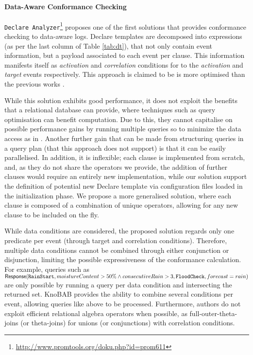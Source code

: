 \paragraph*{Data-Aware Conformance Checking}
\texttt{Declare Analyzer}\footnote{\url{http://www.promtools.org/doku.php?id=prom611}} \cite{BurattinMS16} proposes one of the first solutions that provides conformance checking to data-aware logs. Declare templates are decomposed into \LTLf expressions (as per the last column of Table \ref{tab:dt}), that not only contain event information, but a payload associated to each event per clause. This information manifests itself as \emph{activation} and \emph{correlation} conditions for to the \emph{activation} and \emph{target} events respectively. This approach is claimed to be is more optimised than the previous works \cite{VanDerAalst2005}.%

While this solution exhibits good performance, it does not exploit the benefits that a relational database can provide, where techniques such as query optimisation can benefit computation. Due to this, they cannot capitalise on possible performance gains by running multiple queries so to minimize the data access as in \cite{BellatrecheKB21}. Another further gain that can be made from structuring queries in a query plan (that this approach does not support) is that it can be easily parallelised. In addition, it is inflexible; each clause is implemented from scratch, and, as they do not share the operators we provide, the addition of further clauses would require an entirely new implementation, while our solution support the definition of potential new Declare template via configuration files loaded in the initialization phase. We propose a more generalised solution, where each clause is composed of a combination of unique operators, allowing for any new clause to be included on the fly.

While data conditions are considered, the proposed solution regards only one predicate per event (through target and correlation conditions). Therefore, multiple data conditions cannot be combined through either conjunction or disjunction, limiting the possible expressiveness of the conformance calculation. For example, queries such as 
$\textsf{Response}(\texttt{RainStart},moistureContent\\>50\% \wedge consecutiveRain>3,\texttt{FloodCheck},forecast=rain)$ 
are only possible by running a query per data condition and intersecting the returned set. KnoBAB provides the ability to combine several conditions per event, allowing queries like above to be processed. Furthermore, authors do not exploit efficient relational algebra operators when possible, as full-outer-theta-joins (or theta-joins) for unions (or conjunctions) with correlation conditions.


